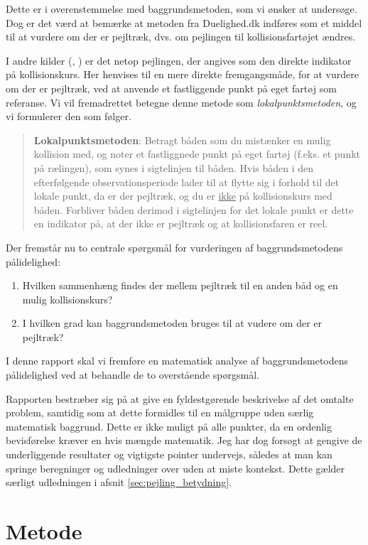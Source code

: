 \documentclass[%
 reprint,
nofootinbib,
aps,
]{revtex4-1}
\begin{document}
Dette er i overenstemmelse med baggrundsmetoden, som vi ønsker at undersøge. Dog er det værd at bemærke at metoden fra Duelighed.dk indføres som et middel til at vurdere om der er pejltræk, dvs. om pejlingen til kollisionsfartøjet ændres. \par
I andre kilder (\cite{studienoter}, \cite{retsinformation} \cite{groensund}) er det netop pejlingen, der angives som den direkte indikator på kollisionskurs. Her henvises til en mere direkte fremgangsmåde, for at vurdere om der er pejltræk, ved at anvende et fastliggende punkt på eget fartøj som referanse. Vi vil fremadrettet betegne denne metode som \textit{lokalpunktsmetoden}, og vi formulerer den som følger.
\begin{quote}
\textbf{Lokalpunktsmetoden}: Betragt båden som du mistænker en mulig kollision med, og noter et fastliggnede punkt på eget fartøj (f.eks. et punkt på rælingen), som synes i sigtelinjen til båden. Hvis båden i den efterfølgende observationsperiode lader til at flytte sig i forhold til det lokale punkt, da er der pejltræk, og du er \underline{ikke} på kollisionskurs med båden. Forbliver båden derimod i sigtelinjen for det lokale punkt er dette en indikator på, at der ikke er pejltræk og at kollisionsfaren er reel.
\end{quote}
Der fremstår nu to centrale spørgsmål for vurderingen af baggrundsmetodens pålidelighed:
\begin{enumerate}
  \item Hvilken sammenhæng findes der mellem pejltræk til en anden båd og en mulig kollisionskurs?
  \item I hvilken grad kan baggrundsmetoden bruges til at vudere om der er pejltræk?
\end{enumerate}
I denne rapport skal vi fremføre en matematisk analyse af baggrundsmetodens pålidelighed ved at behandle de to overstående spørgsmål. \par
Rapporten bestræber sig på at give en fyldestgørende beskrivelse af det omtalte problem, samtidig som at dette formidles til en målgruppe uden særlig matematisk baggrund. Dette er ikke muligt på alle punkter, da en ordenlig bevisførelse kræver en hvis mængde matematik. Jeg har dog forsøgt at gengive de underliggende resultater og vigtigste pointer undervejs, således at man kan springe beregninger og udledninger over uden at miste kontekst. Dette gælder særligt udledningen i afsnit \ref{sec:pejling_betydning}.


\section{Metode}
\end{document}
